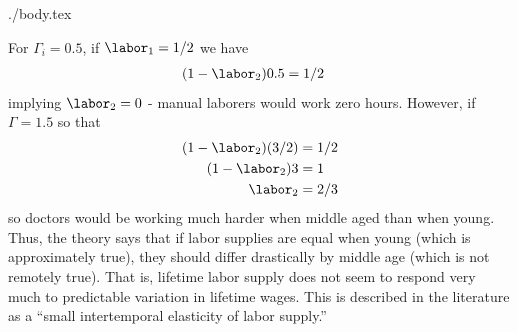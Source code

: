 \documentclass{handout}
\begin{document}
\begin{verbatimwrite}{./body.tex}
{For $\Gamma_{i}=0.5$, if $\labor_{1} = 1/2$ we have 
\begin{equation}\begin{gathered}\begin{aligned}
  (1-\labor_{2})0.5 & =  1/2
\end{aligned}\end{gathered}\end{equation}
implying $\labor_{2} = 0$ - manual laborers would work zero hours.  However,
if $\Gamma=1.5$ so that 
\begin{equation}\begin{gathered}\begin{aligned}
   (1-\labor_{2}) (3/2) & =  1/2
\\ (1-\labor_{2}) 3 & =  1
\\ \labor_{2} & =  2/3
\end{aligned}\end{gathered}\end{equation}
so doctors would be working much harder when middle aged than when
young.  Thus, the theory says that if labor supplies are equal when
young (which is approximately true), they should differ drastically by
middle age (which is not remotely true).  That is, lifetime labor
supply does not seem to respond very much to predictable variation in
lifetime wages.  This is described in the literature as a ``small
intertemporal elasticity of labor supply.''

 }{}


\end{verbatimwrite}



\end{document}
